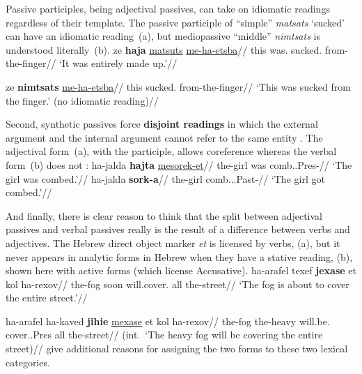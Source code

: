 Passive participles, being adjectival passives, can take on idiomatic readings regardless of their template. The passive participle of ``simple'' \emph{matsats} `sucked' can have an idiomatic reading~(\nextx a), but mediopassive ``middle'' \emph{nimtsats} is understood literally~(\nextx b).
\pex
    \a
        \begingl
        \gla ze \textbf{haja} \underline{matsuts} \underline{me-ha-etsba}//
        \glb this was. sucked. from-the-finger//
        \glft `It was entirely made up.'//
        \endgl
    
    \a
        \begingl
        \gla ze \textbf{nimtsats} \underline{me-ha-etsba}//
        \glb this sucked. from-the-finger//
        \glft `This was sucked from the finger.' (no idiomatic reading)//
        \endgl
\xe

Second, synthetic passives force \textbf{disjoint readings} in which the external argument and the internal argument cannot refer to the same entity \citep{bakeretal89}. The adjectival form~(\nextx a), with the participle, allows coreference whereas the verbal form~(\nextx b) does not \citep[720]{sichel09}:
\pex \label{ex:disjoint}
    \a \begingl
        \gla {}ha-jalda \textbf{hajta} \underline{mesorek-et}//
        \glb the-girl was comb..Pres-//
        \glft `The girl was combed.'//
        \endgl
    \a
        \begingl
        \gla {}ha-jalda \textbf{sork-a}//
        \glb the-girl comb...Past-//
        \glft `The girl got combed.'//
        \endgl
\xe

And finally, there is clear reason to think that the split between adjectival passives and verbal passives really is the result of a difference between verbs and adjectives. The Hebrew direct object marker \emph{et} is licensed by verbs, (\nextx a), but it never appears in analytic forms in Hebrew when they have a stative reading, (\nextx b), shown here with active forms (which license Accusative). 
\pex
	\a \begingl
		\gla ha-arafel texef \textbf{jexase} et kol ha-rexov//
		\glb the-fog soon will.cover.  all the-street//
		\glft `The fog is about to cover the entire street.'//
		\endgl
	
	\a {}
		\begingl
		\gla ha-arafel ha-kaved \textbf{jihie} \underline{mexase} et kol ha-rexov//
		\glb the-fog the-heavy will.be. cover..Pres  all the-street//
		\glft (int.~`The heavy fog will be covering the entire street)//
		\endgl
\xe
\cite{horvathsiloni08} give additional reasons for assigning the two forms to these two lexical categories.


